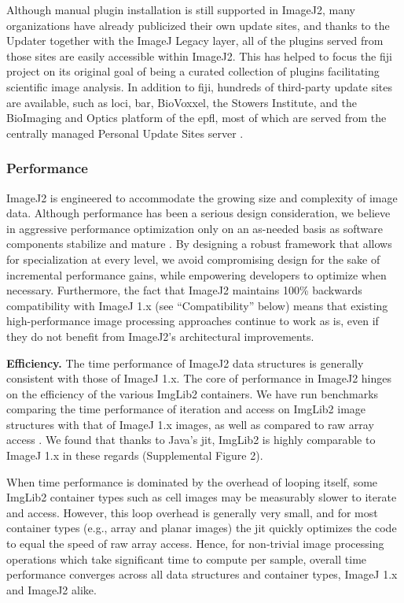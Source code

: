 \documentclass{bmcart}
\begin{document}
Although manual plugin installation is still supported in ImageJ2, many
organizations have already publicized their own update sites, and thanks to the
Updater together with the ImageJ Legacy layer, all of the plugins served from
those sites are easily accessible within ImageJ2. This has helped to focus the
\acrshort{fiji} project on its original goal of being a curated collection of
plugins facilitating scientific image analysis. In addition to \acrshort{fiji},
hundreds of third-party update sites are available, such as \acrshort{loci},
\acrfull{bar}, BioVoxxel, the Stowers Institute, and the BioImaging and Optics
platform of the \acrfull{epfl}, most of which are served from the centrally
managed Personal Update Sites server \cite{imagej_sites}.

\subsubsection*{Performance}

ImageJ2 is engineered to accommodate the growing size and complexity of image
data. Although performance has been a serious design consideration, we believe
in aggressive performance optimization only on an as-needed basis as software
components stabilize and mature \cite{premature_optimization}. By designing a
robust framework that allows for specialization at every level, we avoid
compromising design for the sake of incremental performance gains, while
empowering developers to optimize when necessary. Furthermore, the fact that
ImageJ2 maintains 100\% backwards compatibility with ImageJ 1.x (see
``Compatibility'' below) means that existing high-performance image processing
approaches continue to work as is, even if they do not benefit from ImageJ2's
architectural improvements.

\textbf{Efficiency.} The time performance of ImageJ2 data structures is
generally consistent with those of ImageJ 1.x. The core of performance in
ImageJ2 hinges on the efficiency of the various ImgLib2 containers. We have run
benchmarks comparing the time performance of iteration and access on ImgLib2
image structures with that of ImageJ 1.x images, as well as compared to raw
array access \cite{imglib2_benchmarks}. We found that thanks to Java's
\acrfull{jit}, ImgLib2 is highly comparable to ImageJ 1.x in these regards
(Supplemental Figure 2).

When time performance is dominated by the overhead of looping itself, some
ImgLib2 container types such as cell images may be measurably slower to iterate
and access. However, this loop overhead is generally very small, and for most
container types (e.g., array and planar images) the \acrshort{jit} quickly
optimizes the code to equal the speed of raw array access. Hence, for
non-trivial image processing operations which take significant time to compute
per sample, overall time performance converges across all data structures and
container types, ImageJ 1.x and ImageJ2 alike.
\end{document}
